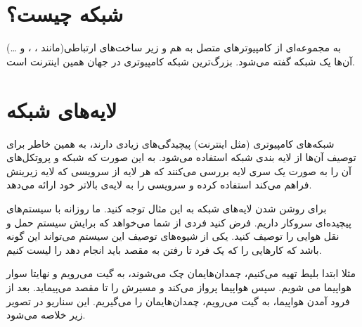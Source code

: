 \documentclass[]{article}
\begin{document}
\newpage
\pagestyle{fancy}
\fancyhf{}
\fancyfoot{}
\cfoot{\thepage}
\renewcommand{\headrulewidth}{2pt}

\KashidaOff



\tableofcontents

\newpage

 \Large \textbf{\\\\
}

\section*{{\titr شبکه چیست؟}}

به مجموعه‌ای از کامپیوتر‌های متصل به هم و زیر ساخت‌های ارتباطی(مانند ، ،  و …) آن‌ها یک شبکه گفته می‌شود. بزرگ‌ترین شبکه کامپیوتری در جهان همین اینترنت است.


\section*{{\titr لایه‌های شبکه}}

شبکه‌های کامپیوتری (مثل اینترنت)  پیچیدگی‌های زیادی دارند، به همین خاطر برای توصیف آن‌ها از لایه بندی شبکه استفاده می‌شود. به این صورت که شبکه و پروتکل‌های آن را به صورت یک سری لایه بررسی می‌کنند که هر لایه از سرویسی که لایه زیرینش فراهم می‌کند استفاده کرده و سرویسی را به لایه‌ی بالاتر خود ارائه می‌دهد.

برای روشن شدن لایه‌های شبکه به این مثال توجه کنید. ما روزانه با سیستم‌های پیچیده‌ای سروکار داریم. فرض کنید فردی از شما می‌خواهد که برایش سیستم حمل و نقل هوایی را توصیف کنید. یکی از شیوه‌های توصیف این سیستم می‌تواند این گونه باشد که کارهایی را که یک فرد تا رفتن به مقصد باید انجام دهد را لیست کنیم.

 مثلا ابتدا بلیط تهیه می‌کنیم، چمدان‌هایمان چک می‌شوند، به گیت می‌رویم و نهایتا سوار هواپیما می شویم. سپس هواپیما پرواز می‌کند و مسیرش را تا مقصد می‌پیماید. بعد از فرود آمدن هواپیما، به گیت می‌رویم، چمدان‌هایمان را می‌گیریم. این سناریو در تصویر زیر خلاصه می‌شود.
\end{document}

